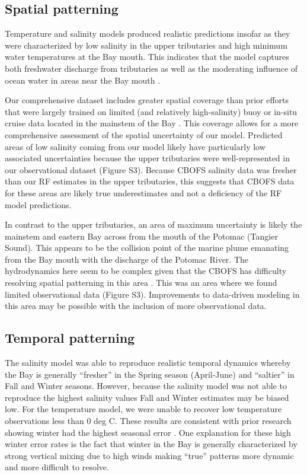 \documentclass{article}
\begin{document}
\subsection{Spatial patterning}

Temperature and salinity models produced realistic predictions insofar as they were characterized by low salinity in the upper tributaries and high minimum water temperatures at the Bay mouth. This indicates that the model captures both freshwater discharge from tributaries as well as the moderating influence of ocean water in areas near the Bay mouth \cite{dingSpatiotemporalPatternsWater2015}.

Our comprehensive dataset includes greater spatial coverage than prior efforts that were  largely trained on limited (and relatively high-salinity) buoy or in-situ cruise data located in the mainstem of the Bay \cite{vogelAssessingSatelliteSea2016, geigerSatellitederivedCoastalOcean2013, ondrusekDevelopmentNewOptical2012}. This coverage allows for a more comprehensive assessment of the spatial uncertainty of our model. Predicted areas of low salinity coming from our model likely have particularly low associated uncertainties because the upper tributaries were well-represented in our observational dataset (Figure S3). Because CBOFS salinity data was fresher than our RF estimates in the upper tributaries, this suggests that CBOFS data for these areas are likely true underestimates and not a deficiency of the RF model predictions.

In contrast to the upper tributaries, an area of maximum uncertainty is likely the mainstem and eastern Bay across from the mouth of the Potomac (Tangier Sound). This appears to be the collision point of the marine plume emanating from the Bay mouth with the discharge of the Potomac River. The hydrodynamics here seem to be complex given that the CBOFS has difficulty resolving spatial patterning in this area \cite{lanerolle2011second}. This was an area where we found limited observational data (Figure S3). Improvements to data-driven modeling in this area may be possible with the inclusion of more observational data.


\subsection{Temporal patterning}

The salinity model was able to reproduce realistic temporal dynamics whereby the Bay is generally “fresher” in the Spring season (April-June) and “saltier” in Fall and Winter seasons. However, because the salinity model was not able to reproduce the highest salinity values Fall and Winter estimates may be biased low. For the temperature model, we were unable to recover low temperature observations less than 0 deg C. These results are consistent with prior research showing winter had the highest seasonal error  \cite{geigerSatellitederivedCoastalOcean2013}. One explanation for these high winter error rates is the fact that winter in the Bay is generally characterized by strong vertical mixing due to high winds \cite{sonWaterPropertiesChesapeake2012, xuClimateForcingSalinity2012} making “true” patterns more dynamic and more difficult to resolve.
\end{document}
